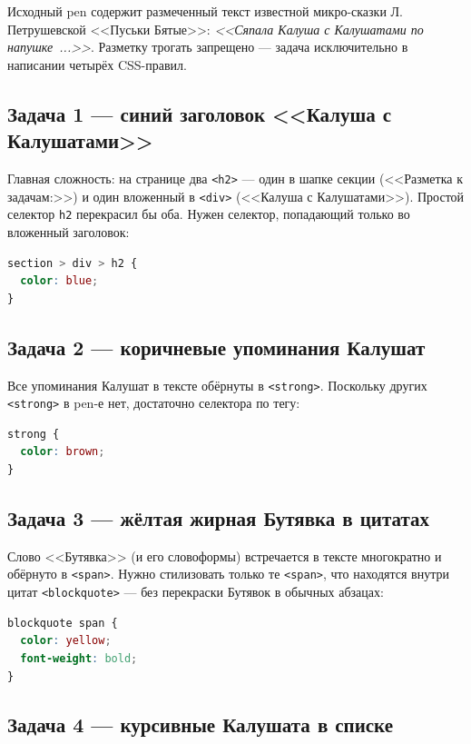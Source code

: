 Исходный pen содержит размеченный текст известной микро-сказки
Л.\,Петрушевской <<Пуськи Бятые>>: \textit{<<Сяпала Калуша с
Калушатами по напушке~...>>}. Разметку трогать запрещено --- задача
исключительно в написании четырёх CSS-правил.

\subsection{Задача 1 --- синий заголовок <<Калуша с Калушатами>>}

Главная сложность: на странице два \texttt{<h2>} --- один в шапке
секции (<<Разметка к задачам:>>) и один вложенный в
\texttt{<div>} (<<Калуша с Калушатами>>). Простой селектор
\texttt{h2} перекрасил бы оба. Нужен селектор, попадающий только во
вложенный заголовок:

\begin{lstlisting}[language=CSS]
section > div > h2 {
  color: blue;
}
\end{lstlisting}

\subsection{Задача 2 --- коричневые упоминания Калушат}

Все упоминания Калушат в тексте обёрнуты в \texttt{<strong>}.
Поскольку других \texttt{<strong>} в pen-е нет, достаточно
селектора по тегу:

\begin{lstlisting}[language=CSS]
strong {
  color: brown;
}
\end{lstlisting}

\subsection{Задача 3 --- жёлтая жирная Бутявка в цитатах}

Слово <<Бутявка>> (и его словоформы) встречается в тексте многократно
и обёрнуто в \texttt{<span>}. Нужно стилизовать только те
\texttt{<span>}, что находятся внутри цитат \texttt{<blockquote>} ---
без перекраски Бутявок в обычных абзацах:

\begin{lstlisting}[language=CSS]
blockquote span {
  color: yellow;
  font-weight: bold;
}
\end{lstlisting}

\subsection{Задача 4 --- курсивные Калушата в списке}


